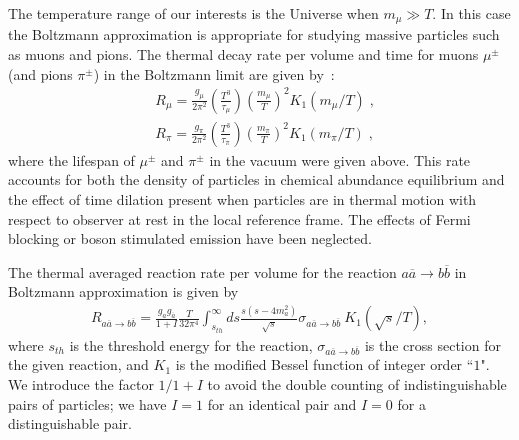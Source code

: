 The temperature range of our interests is the Universe when $m_\mu\gg T$. In this case  the Boltzmann approximation is appropriate for studying massive particles such as muons and pions. The thermal decay rate per volume and time  for muons $\mu^\pm$ (and pions $\pi^\pm$) in the Boltzmann limit  are given by~\cite{Kuznetsova:2010pi}:
\begin{align}
&R_\mu=\frac{g_\mu}{2\pi^2}\left(\frac{T^3}{\tau_\mu}\right)\left(\frac{m_\mu}{T}\right)^2K_1(m_\mu/T)\;,\\
&R_\pi=\frac{g_\pi}{2\pi^2}\left(\frac{T^3}{\tau_\pi}\right)\left(\frac{m_\pi}{T}\right)^2K_1(m_\pi/T)\;, 
\end{align}
where the lifespan of $\mu^\pm$ and $\pi^\pm$ in the vacuum were given above. This rate accounts for both the density of particles in chemical abundance equilibrium and the effect of time dilation present when particles are in thermal motion with respect to observer at rest in the local reference frame. The effects of Fermi blocking or boson stimulated emission have been neglected.

The thermal averaged reaction rate per volume for the reaction $a\overline{a}\rightarrow b\overline{b}$ in Boltzmann approximation is given by \cite{Letessier:2002ony}
\begin{align}\label{pairR}
R_{a\overline{a}\rightarrow b\overline{b}}=\frac{g_ag_{\overline{a}}}{1+I}\frac{T}{32\pi^4}\int_{s_{th}}^\infty ds\frac{s(s-4m^2_a)}{\sqrt{s}}\sigma_{a\overline{a}\rightarrow b\overline{b}}~K_1(\sqrt{s}/T),
\end{align}
where $s_{th}$ is the threshold energy for the reaction, $\sigma_{a\overline{a}\rightarrow b\overline{b}}$ is the cross section for the given reaction, and $K_1$ is the modified
Bessel function of integer order ``$1$". We introduce the factor $1/1+I$ to avoid the double counting of indistinguishable pairs of particles; we have $I=1$ for an identical pair and $I=0$ for a distinguishable pair.

